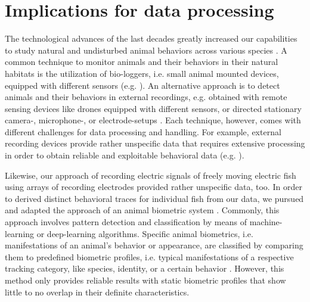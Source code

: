 \section{Implications for data processing}

The technological advances of the last decades greatly increased our capabilities to study natural and undisturbed animal behaviors across various species \citep{Hughey2018, Jolles2021}. A common technique to monitor animals and their behaviors in their natural habitats is the utilization of bio-loggers, i.e. small animal mounted devices, equipped with different sensors (e.g. \citealp{Strandburg2015}). An alternative approach is to detect animals and their behaviors in external recordings, e.g. obtained with remote sensing devices like drones equipped with different sensors, or directed stationary camera-, microphone-, or electrode-setups \citep{Anderson2014, Dell2014, Hughey2018}. Each technique, however, comes with different challenges for data processing and handling. For example, external recording devices provide rather unspecific data that requires extensive processing in order to obtain reliable and exploitable behavioral data (e.g. \citealp{Kuhl2013, Dell2014}).

Likewise, our approach of recording electric signals of freely moving electric fish using arrays of recording electrodes provided rather unspecific data, too. In order to derived distinct behavioral traces for individual fish from our data, we pursued and adapted the approach of an animal biometric system \citep{Kuhl2013}. Commonly, this approach involves pattern detection and classification by means of machine-learning or deep-learning algorithms. Specific animal biometrics, i.e. manifestations of an animal's behavior or appearance, are classified by comparing them to predefined biometric profiles, i.e. typical manifestations of a respective tracking category, like species, identity, or a certain behavior \citep{Burghardt2006, Sherley2010, Ernst2011}. However, this method only provides reliable results with static biometric profiles that show little to no overlap in their definite characteristics. 

